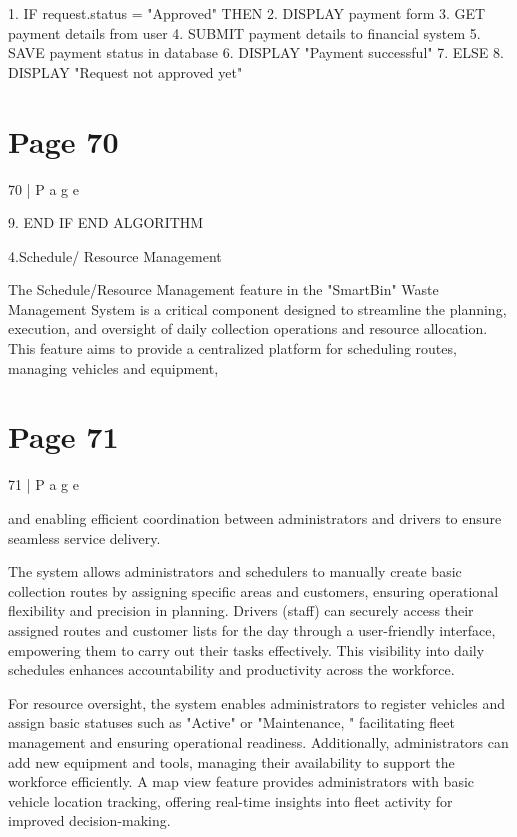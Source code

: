 \documentclass{article}
\begin{document}
1. IF request.status = "Approved" THEN 
    2. DISPLAY payment form 
    3. GET payment details from user 
    4. SUBMIT payment details to financial system 
    5. SAVE payment status in database 
    6. DISPLAY "Payment successful" 
7. ELSE 
    8. DISPLAY "Request not approved yet" 

\section*{Page 70}
70 | P a g e 
 
9. END IF 
END ALGORITHM 
 
 
 
 
 
 
 
 
 
 
 
 
 
 
 
 
 
 
 
 
4.Schedule/ Resource Management 
 
The Schedule/Resource Management feature in the "SmartBin" Waste Management 
System is a critical component designed to streamline the planning, execution, and 
oversight of daily collection operations and resource allocation. This feature aims to 
provide a centralized platform for scheduling routes, managing vehicles and equipment, 

\section*{Page 71}
71 | P a g e 
 
and enabling efficient coordination between administrators and drivers to ensure seamless 
service delivery. 
  
The system allows administrators and schedulers to manually create basic collection 
routes by assigning specific areas and customers, ensuring operational flexibility and 
precision in planning. Drivers (staff) can securely access their assigned routes and 
customer lists for the day through a user-friendly interface, empowering them to carry out 
their tasks effectively. This visibility into daily schedules enhances accountability and 
productivity across the workforce. 
  
For resource oversight, the system enables administrators to register vehicles and assign 
basic statuses such as "Active" or "Maintenance, " facilitating fleet management and 
ensuring operational readiness. Additionally, administrators can add new equipment and 
tools, managing their availability to support the workforce efficiently. A map view feature 
provides administrators with basic vehicle location tracking, offering real-time insights into 
fleet activity for improved decision-making. 
  
\end{document}
